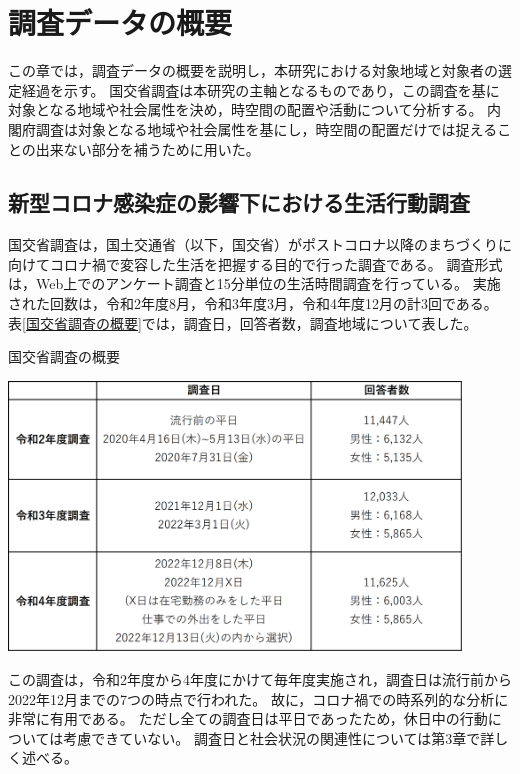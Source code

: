 \documentclass[paper={210mm,297mm},fontsize=15Q,line_length=35zw,number_of_lines=31,head_space=30mm,gutter=40mm,baselineskip=2.0zw,headfoot_verticalposition=1.5zw]{jlreq}
\begin{document}
\section{調査データの概要}

この章では，調査データの概要を説明し，本研究における対象地域と対象者の選定経過を示す。
国交省調査は本研究の主軸となるものであり，この調査を基に対象となる地域や社会属性を決め，時空間の配置や活動について分析する。
内閣府調査は対象となる地域や社会属性を基にし，時空間の配置だけでは捉えることの出来ない部分を補うために用いた。

\subsection{新型コロナ感染症の影響下における生活行動調査}

国交省調査は，国土交通省（以下，国交省）がポストコロナ以降のまちづくりに向けてコロナ禍で変容した生活を把握する目的で行った調査である。
調査形式は，Web上でのアンケート調査と15分単位の生活時間調査を行っている。
実施された回数は，令和2年度8月，令和3年度3月，令和4年度12月の計3回である。
表\ref{国交省調査の概要}では，調査日，回答者数，調査地域について表した。

\begin{table}[H]
  \caption{国交省調査の概要}
  \centering
  \includegraphics[width=120mm]{../Figure/c02s01_table_国交省調査の概要.png}
  \label{国交省調査の概要}
\end{table}

この調査は，令和2年度から4年度にかけて毎年度実施され，調査日は流行前から2022年12月までの7つの時点で行われた。
故に，コロナ禍での時系列的な分析に非常に有用である。
ただし全ての調査日は平日であったため，休日中の行動については考慮できていない。
調査日と社会状況の関連性については第3章で詳しく述べる。
\end{document}
